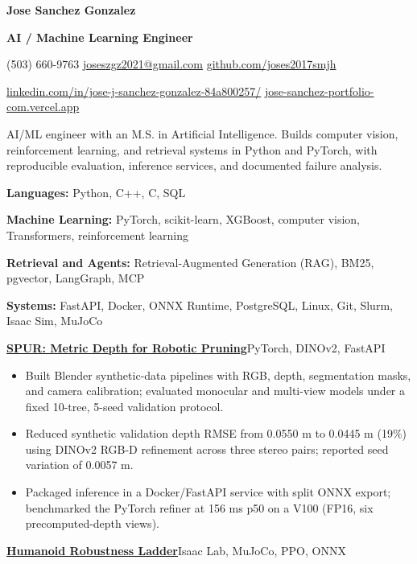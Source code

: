\documentclass[letterpaper,10pt]{article}
\newcommand{\resumeSection}[1]{\par\vspace{7pt}{\large\bfseries #1}\par\vspace{3pt}}
\newcommand{\project}[3]{\par\vspace{3pt}\textbf{\href{#2}{#1}}\enspace\textbar\enspace #3\par}
\newcommand{\resumeItem}[1]{\item #1}
\begin{document}
{\fontsize{22}{25}\selectfont\bfseries Jose Sanchez Gonzalez}\par
\vspace{2pt}
\textbf{AI / Machine Learning Engineer}\par
\vspace{3pt}
{\fontsize{9}{10.5}\selectfont
(503) 660-9763\enspace\textbar\enspace
\href{mailto:joseszgz2021@gmail.com}{joseszgz2021@gmail.com}\enspace\textbar\enspace
\href{https://github.com/joses2017smjh}{github.com/joses2017smjh}\par
\href{https://linkedin.com/in/jose-j-sanchez-gonzalez-84a800257/}{linkedin.com/in/jose-j-sanchez-gonzalez-84a800257/}\enspace\textbar\enspace
\href{https://jose-sanchez-portfolio-com.vercel.app/}{jose-sanchez-portfolio-com.vercel.app}\par}
\resumeSection{Summary}
AI/ML engineer with an M.S. in Artificial Intelligence. Builds computer vision, reinforcement learning, and retrieval systems in Python and PyTorch, with reproducible evaluation, inference services, and documented failure analysis.
\resumeSection{Technical Skills}
\textbf{Languages:} Python, C++, C, SQL\par
\textbf{Machine Learning:} PyTorch, scikit-learn, XGBoost, computer vision, Transformers, reinforcement learning\par
\textbf{Retrieval and Agents:} Retrieval-Augmented Generation (RAG), BM25, pgvector, LangGraph, MCP\par
\textbf{Systems:} FastAPI, Docker, ONNX Runtime, PostgreSQL, Linux, Git, Slurm, Isaac Sim, MuJoCo\par
\resumeSection{Projects}
\project{SPUR: Metric Depth for Robotic Pruning}{https://github.com/joses2017smjh/spur-depth-service}{PyTorch, DINOv2, FastAPI}
\begin{itemize}
\resumeItem{Built Blender synthetic-data pipelines with RGB, depth, segmentation masks, and camera calibration; evaluated monocular and multi-view models under a fixed 10-tree, 5-seed validation protocol.}
\resumeItem{Reduced synthetic validation depth RMSE from 0.0550 m to 0.0445 m (19\%) using DINOv2 RGB-D refinement across three stereo pairs; reported seed variation of 0.0057 m.}
\resumeItem{Packaged inference in a Docker/FastAPI service with split ONNX export; benchmarked the PyTorch refiner at 156 ms p50 on a V100 (FP16, six precomputed-depth views).}
\end{itemize}
\project{Humanoid Robustness Ladder}{https://github.com/joses2017smjh/bhl-robustness-ladder}{Isaac Lab, MuJoCo, PPO, ONNX}
\end{document}
